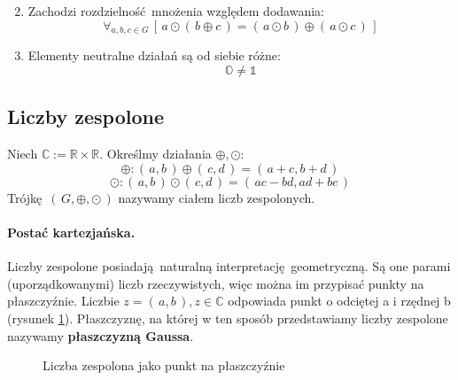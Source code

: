 \begin{definition}
\begin{enumerate}
\begin{equation*}
            \end{equation*}
        \item Zachodzi rozdzielność mnożenia względem dodawania:
            \begin{equation*}
                \forall_{a,b,c \in G} \, [\, a \odot (\, b \oplus c\,) = (\, a \odot b \,) \oplus (\, a \odot c\, )\,]
            \end{equation*}
        \item Elementy neutralne działań są od siebie różne:
            \begin{equation*}
                \mathds{O} \neq \mathds{1}
            \end{equation*}
    \end{enumerate}
\end{definition}
\subsection{Liczby zespolone}
\begin{definition}
    Niech $\mathds{C} := \mathds{R} \times \mathds{R}$. Określmy działania $\oplus ,\odot$:
    \begin{equation*}
        \oplus : (\,a,b\,)\oplus(\,c,d\,) = (\,a+c, b+d\,)
    \end{equation*}
    \begin{equation*}
        \odot : (\,a,b\,)\odot(\,c,d\,) = (\, ac-bd, ad+bc\,)
    \end{equation*}
    Trójkę $(\,G,\oplus,\odot\,)$ nazywamy ciałem liczb zespolonych.
\end{definition}

\paragraph{Postać kartezjańska.} Liczby zespolone posiadają naturalną interpretację geometryczną. Są one parami (uporządkowanymi) liczb rzeczywistych, więc można im przypisać punkty na płaszczyźnie. Liczbie $z = (\,a,b\,), z \in \mathds{C}$ odpowiada punkt o odciętej a i rzędnej b (rysunek \ref{fig:lba_zespolona}). Płaszczyznę, na której w ten sposób przedstawiamy liczby zespolone nazywamy \textbf{płaszczyzną Gaussa}.
\begin{figure}[htbp!]
    \centering
    \caption{Liczba zespolona jako punkt na płaszczyźnie}
    \label{fig:lba_zespolona}
    \vspace{3mm}
\end{figure}
